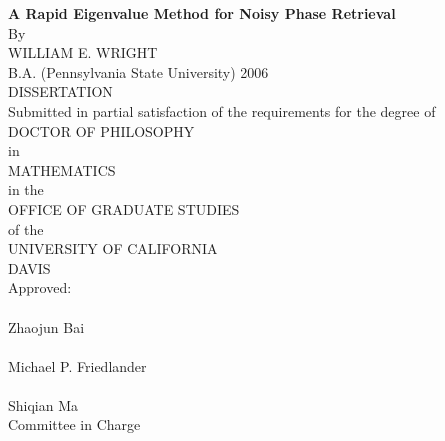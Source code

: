 \begin{center}
   \null\vfill
   \textbf{%
      A Rapid Eigenvalue Method for Noisy Phase Retrieval
   }%
   \\
   \bigskip
   By \\
   \bigskip
   WILLIAM E. WRIGHT \\
   \bigskip
   B.A. (Pennsylvania State University) 2006 \\
   \bigskip
   DISSERTATION \\
   \bigskip
   Submitted in partial satisfaction of the requirements for the
   degree of \\
   \bigskip
   DOCTOR OF PHILOSOPHY \\
   \bigskip
   in \\
   \bigskip
   MATHEMATICS\\
   \bigskip
   in the \\
   \bigskip
   OFFICE OF GRADUATE STUDIES \\
   \bigskip        
   of the \\
   \bigskip
   UNIVERSITY OF CALIFORNIA \\
   \bigskip
   DAVIS \\
   \bigskip
   Approved: \\
   \bigskip
   \bigskip
   \makebox[3in]{\hrulefill} \\
   Zhaojun Bai \\
   \bigskip
   \bigskip
   \makebox[3in]{\hrulefill} \\
   Michael P. Friedlander \\
   \bigskip
   \bigskip
   \makebox[3in]{\hrulefill} \\
   Shiqian Ma \\
   \bigskip
   Committee in Charge \\
    \\
   \vfill
\end{center}
